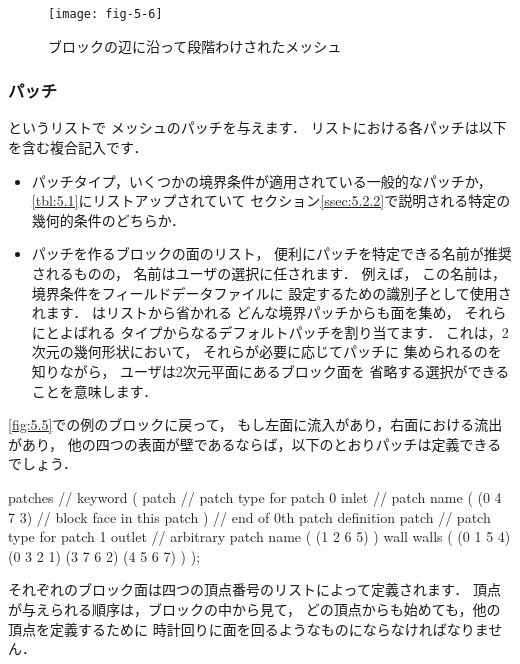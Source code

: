 \begin{figure}[ht]
 \texttt{[image: fig-5-6]}
 \caption{ブロックの辺に沿って段階わけされたメッシュ}
 \label{fig:5.6}
\end{figure}


\subsubsection{パッチ}
\label{sssec:5.3.1.4}
%
%
というリストで
メッシュのパッチを与えます．
リストにおける各パッチは以下を含む複合記入です．
\begin{itemize}
 \item パッチタイプ，いくつかの境界条件が適用されている一般的なパッチか，
       \autoref{tbl:5.1}にリストアップされていて
       セクション\autoref{ssec:5.2.2}で説明される特定の幾何的条件のどちらか．
 \item パッチを作るブロックの面のリスト，
       便利にパッチを特定できる名前が推奨されるものの，
       名前はユーザの選択に任されます．
       例えば，
       この名前は，境界条件をフィールドデータファイルに
       設定するための識別子として使用されます．
       はリストから省かれる
       どんな境界パッチからも面を集め，
       それらにとよばれる
       タイプからなるデフォルトパッチを割り当てます．
       これは，2次元の幾何形状において，
       それらが必要に応じてパッチに
       集められるのを知りながら，
       ユーザは2次元平面にあるブロック面を
       省略する選択ができることを意味します．
\end{itemize}
\autoref{fig:5.5}での例のブロックに戻って，
もし左面に流入があり，右面における流出があり，
他の四つの表面が壁であるならば，以下のとおりパッチは定義できるでしょう．
\begin{OFverbatim}[file]
patches // keyword
(
    patch // patch type for patch 0
    inlet // patch name
    (
        (0 4 7 3) // block face in this patch
    ) // end of 0th patch definition
    patch // patch type for patch 1
    outlet // arbitrary patch name
    (
        (1 2 6 5)
    )
    wall
    walls
    (
        (0 1 5 4)
        (0 3 2 1)
        (3 7 6 2)
        (4 5 6 7)
    )
);
\end{OFverbatim}
それぞれのブロック面は四つの頂点番号のリストによって定義されます．
頂点が与えられる順序は，ブロックの中から見て，
どの頂点からも始めても，他の頂点を定義するために
時計回りに面を回るようなものにならなければなりません．


